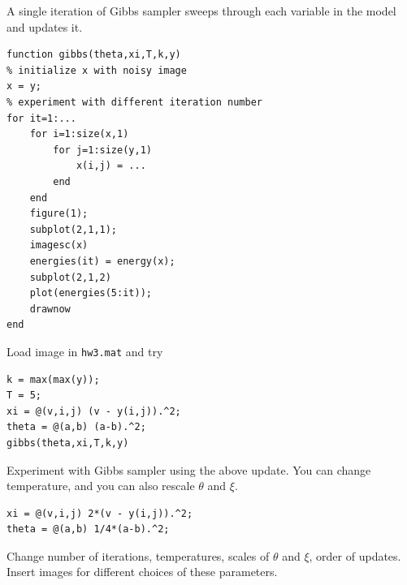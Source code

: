 \documentclass{article}
\begin{document}
\newproblem{2pt}
A single iteration of Gibbs sampler sweeps through each variable in the model and updates it.
\begin{verbatim}
function gibbs(theta,xi,T,k,y)
% initialize x with noisy image
x = y;
% experiment with different iteration number
for it=1:...
    for i=1:size(x,1)
        for j=1:size(y,1)
            x(i,j) = ...
        end
    end
    figure(1);
    subplot(2,1,1);
    imagesc(x)
    energies(it) = energy(x);
    subplot(2,1,2)
    plot(energies(5:it));
    drawnow
end
\end{verbatim}
Load image in \verb|hw3.mat| and try
\begin{verbatim}
k = max(max(y));
T = 5;
xi = @(v,i,j) (v - y(i,j)).^2;
theta = @(a,b) (a-b).^2;
gibbs(theta,xi,T,k,y)
\end{verbatim}
Experiment with Gibbs sampler using the above update.
You can change temperature, and you can also rescale $\theta$ and $\xi$. 
\begin{verbatim}
xi = @(v,i,j) 2*(v - y(i,j)).^2;
theta = @(a,b) 1/4*(a-b).^2;
\end{verbatim}
Change number of iterations, temperatures, scales of $\theta$ and $\xi$, order of updates. Insert images for different choices of these parameters.
\end{document}
